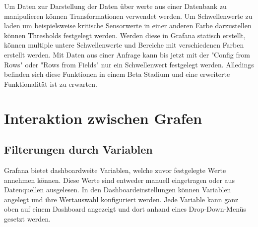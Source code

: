 \documentclass[a4paper, 12pt, oneside]{scrbook}
\begin{document}
	 	
	 	
	 	\noindent Um Daten zur Darstellung der Daten über werte aus einer Datenbank zu manipulieren können Transformationen verwendet werden. Um Schwellenwerte zu laden um beispielsweise kritische Sensorwerte in einer anderen Farbe darzustellen können Thresholds festgelegt werden. Werden diese in Grafana statisch erstellt, können multiple untere Schwellenwerte und Bereiche mit verschiedenen Farben erstellt werden. Mit Daten aus einer Anfrage kann bis jetzt mit der "Config from Rows" oder "Rows from Fields" nur ein Schwellenwert festgelegt werden. Alledings befinden sich diese Funktionen in einem Beta Stadium und eine erweiterte Funktionalität ist zu erwarten. \cite{GrafanaLabs:Thresholds}
	 	
 		
	 \section{Interaktion zwischen Grafen}
	 	
	 	\subsection{Filterungen durch Variablen}
	 	
	 	\noindent Grafana bietet dashboardweite Variablen, welche zuvor festgelegte Werte annehmen können. Diese Werte sind entweder manuell eingetragen oder aus Datenquellen ausgelesen. In den Dashboardeinstellungen können Variablen angelegt und ihre Wertauswahl konfiguriert werden. Jede Variable kann ganz oben auf einem Dashboard angezeigt und dort anhand eines Drop-Down-Menüs gesetzt werden. 
	 	
\end{document}
